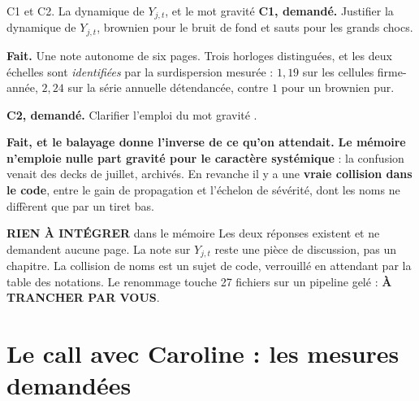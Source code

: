 \documentclass[11pt]{beamer}
\newcommand{\rien}{\textbf{RIEN À INTÉGRER}}
\newcommand{\atrancher}{\textbf{À TRANCHER PAR VOUS}}
\newcommand{\srcs}[1]{\vspace{0.8mm}{\tiny\textcolor{gray!50!black}{Sources : #1}}}
\begin{document}
\begin{frame}{C1 et C2. La dynamique de $Y_{j,t}$, et le mot \og gravité \fg}
\scriptsize
\textbf{C1, demandé.} Justifier la dynamique de $Y_{j,t}$, brownien pour le bruit de fond et
sauts pour les grands chocs.
\vspace{1mm}

\textbf{Fait.} Une note autonome de six pages. Trois horloges distinguées, et les deux échelles
sont \emph{identifiées} par la surdispersion mesurée : $1{,}19$ sur les cellules firme-année,
$2{,}24$ sur la série annuelle détendancée, contre $1$ pour un brownien pur.
\vspace{1mm}

\textbf{C2, demandé.} Clarifier l'emploi du mot \og gravité \fg.
\vspace{1mm}

\textbf{Fait, et le balayage donne l'inverse de ce qu'on attendait.} \textbf{Le mémoire
n'emploie nulle part \og gravité \fg{} pour le caractère systémique} : la confusion venait des
decks de juillet, archivés. En revanche il y a une \textbf{vraie collision dans le code}, entre
le gain de propagation et l'échelon de sévérité, dont les noms ne diffèrent que par un tiret
bas.
\begin{block}{\rien{} dans le mémoire}
Les deux réponses existent et ne demandent aucune page. La note sur $Y_{j,t}$ reste une pièce de
discussion, pas un chapitre. La collision de noms est un sujet de code, verrouillé en attendant
par la table des notations. Le renommage touche 27 fichiers sur un pipeline gelé : \atrancher.
\end{block}
\srcs{script~\texttt{08b}}
\end{frame}

\section*{Le call avec Caroline : les mesures demandées}
\end{document}
